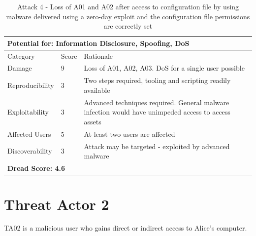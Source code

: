 \documentclass [11pt, proquest] {uwthesis}[2020/02/24]
\begin{document}
\begin{table}[H]
\begin{tabular}{|m{3cm}|m{.9cm}|p{27em} |}
\multicolumn{3}{l}{Potential for: Information Disclosure, Spoofing, DoS}                   \\
\hline
Category & Score & Rationale \\
\hline
Damage          & 9     & Loss of A01, A02, A03. DoS for a single user possible            \\
\hline
Reproducibility & 3     & Two steps required, tooling and scripting readily available    \\
\hline
Exploitability & 3      & Advanced techniques required. General malware infection would have unimpeded access to access assets  \\
\hline
Affected Users  & 5     & At least two users are affected                      \\
\hline
Discoverability & 3     & Attack may be targeted - exploited by advanced malware \\
\hline
\multicolumn{3}{l}{\textbf{Dread Score: 4.6}} 
\end{tabular}
\caption{Attack 4 - Loss of A01 and A02 after access to configuration file by using malware delivered using a zero-day exploit and the configuration file permissions are correctly set}
\label{ref:attack4}
\end{table}

\section{Threat Actor 2}
TA02 is a malicious user who gains direct or indirect access to Alice's computer.  
\end{document}
